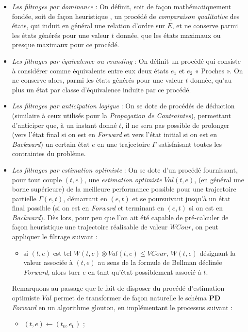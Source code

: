 \begin{itemize}[label=$\square$]
	\item	 \textit{Les filtrages par dominance} : On définit, soit de façon mathématiquement fondée, soit de façon heuristique
	, un procédé de \textit{comparaison qualitative} des états, qui induit en général une relation d'ordre sur $E$, et ne conserve parmi les états générés pour une valeur $t$ donnée, que les états maximaux ou presque maximaux pour ce procédé.
	\item		\textit{Les filtrages par équivalence ou rounding} : On définit un procédé qui consiste à considérer comme équivalents entre eux deux états $e_1$ et $e_2$ « Proches ». On ne conserve alors, parmi les états générés pour une valeur $t$ donnée, qu'au plus un état par classe d'équivalence induite par ce procédé.
	\item		\textit{Les filtrages par anticipation logique} : On se dote de procédés de déduction (similaire à ceux utilisés pour la \textit{Propagation de Contraintes}), permettant d'anticiper que, à un instant donné $t$, il ne sera pas possible de prolonger (vers l'état final si on est en \textit{Forward} et vers l'état initial si on est en \textit{Backward}) un certain état $e$ en une trajectoire $\Gamma$ satisfaisant toutes les contraintes du problème. 
	\item	\textit{Les filtrages par estimation optimiste} : On se dote d'un procédé fournissant, pour tout couple $(t, e)$, une \textit{estimation optimiste} $Val(t, e)$, (en général une borne supérieure) de la meilleure performance possible pour une trajectoire partielle $\Gamma(e, t)$, démarrant en $(e, t)$ et se poursuivant jusqu'à un état final possible (si on est en \textit{Forward} et terminant en $(e, t)$ si on est en \textit{Backward}). Dès lors, pour peu que l'on ait été capable de pré-calculer de façon heuristique une trajectoire réalisable de valeur $WCour$, on peut appliquer le filtrage suivant : 
	\begin{itemize}
	\item si $(t, e)$ est tel $W(t, e) \otimes Val(t, e) \leq VCour$, $W(t, e)$ désignant la valeur associée à $(t, e)$ au sens de la formule de Bellman déclinée \textit{Forward},  alors tuer $e$ en tant qu'état possiblement associé à $t$.
	\end{itemize}
	Remarquons au passage que le fait de disposer du procédé d'estimation optimiste $Val$ permet de transformer de façon naturelle le schéma \textbf{PD} \textit{Forward} en un algorithme glouton, en implémentant le processus suivant :
	\begin{itemize}
	\item $(t, e) \leftarrow (t_0, e_0)$ ; 
	

\end{itemize}
\end{itemize}
